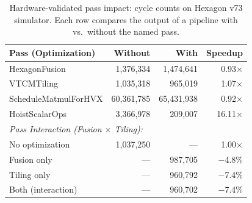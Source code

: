 
\begin{table}[t]
\centering
\caption{Hardware-validated pass impact: cycle counts on Hexagon v73 simulator.
Each row compares the output of a pipeline with vs.\ without the named pass.}
\label{tab:hw-eval}
\begin{tabular}{lrrr}
\toprule
\textbf{Pass (Optimization)} & \textbf{Without} & \textbf{With} & \textbf{Speedup} \\
\midrule
HexagonFusion & 1,376,334 & 1,474,641 & 0.93$\times$ \\
VTCMTiling & 1,035,318 & 965,019 & 1.07$\times$ \\
ScheduleMatmulForHVX & 60,361,785 & 65,431,938 & 0.92$\times$ \\
HoistScalarOps & 3,366,978 & 209,007 & 16.11$\times$ \\
\midrule
\multicolumn{4}{l}{\textit{Pass Interaction (Fusion $\times$ Tiling):}} \\
No optimization & 1,037,250 & --- & 1.00$\times$ \\
Fusion only & --- & 987,705 & $-$4.8\% \\
Tiling only & --- & 960,792 & $-$7.4\% \\
Both (interaction) & --- & 960,702 & $-$7.4\% \\
\bottomrule
\end{tabular}
\end{table}